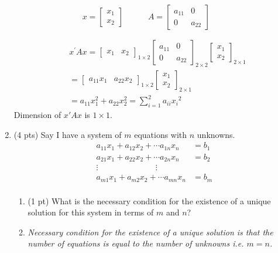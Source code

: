 \documentclass{./../../../Latex/tests}
\begin{document}
\begin{enumerate}
$$
x = \begin{bmatrix}
x_1 \\ x_2
\end{bmatrix} \quad \quad \quad
A = \begin{bmatrix}
a_{11} & 0 \\ 0 & a_{22}
\end{bmatrix} \quad \quad
$$

$$
\begin{aligned}
& x^{\prime} A x=\left[\begin{array}{ll}x_{1} & x_{2}\end{array}\right]_{1 \times 2}\left[\begin{array}{cc}a_{11} & 0 \\0 & a_{22}\end{array}\right]_{2 \times 2}\left[\begin{array}{l}x_{1} \\x_{2}\end{array}\right]_{2 \times 1} \\
& =\left[\begin{array}{lll}a_{11} x_{1} & a_{22} x_{2}\end{array}\right]_{1 \times 2}\left[\begin{array}{l}x_{1} \\x_{2}\end{array}\right]_{2 \times 1} \\
& =a_{11} x_{1}^{2}+a_{22} x_{2}^{2}=\sum_{i=1}^{2} a_{i i} x_{i}{ }^{2}
\end{aligned}
$$
Dimension of $x'Ax$ is $1 \times 1$.
\newpage
\item (4 pts) Say I have a system of $m$ equations with $n$ unknowns. 
\begin{align*}
	a_{11} x_1 + a_{12} x_2 + \cdots a_{1n} x_n &= b_1 \\
	a_{21} x_1 + a_{22} x_2 + \cdots a_{2n} x_n &= b_2 \\
	\vdots \quad \quad \quad \quad \quad \quad \quad \vdots \\
	a_{m1} x_1 + a_{m2} x_2 + \cdots a_{mn} x_n &= b_m \\
\end{align*}
\begin{enumerate}
	\item (1 pt) What is the necessary condition for the existence of a unique solution for this system in terms of $m$ and $n$? 
	\item [] \textit{Necessary condition for the existence of a unique solution is that the number of equations is equal to the number of unknowns i.e. $m=n$. } \\

\end{enumerate}
\end{enumerate}
\end{document}

